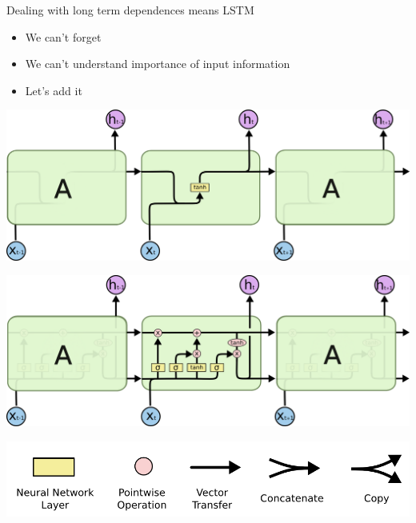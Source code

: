 \documentclass{beamer}
\begin{document}
\begin{frame}{Dealing with long term dependences means LSTM}
	\begin{itemize}
		 \item We can't forget
		 \item We can't understand importance of input information
		 \item Let's add it 
	\end{itemize}
	\begin{center}
		 \includegraphics[scale=0.25]{./img/lstm_rnn}
		
		 \includegraphics[scale=0.25]{./img/lstm_full}
		
		 \includegraphics[scale=0.25]{./img/lstm_not}
	\end{center}
\end{frame}
\end{document}
